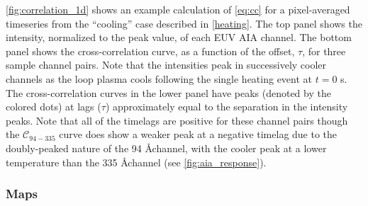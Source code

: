\autoref{fig:correlation_1d} shows an example calculation of \autoref{eq:cc} for a pixel-averaged timeseries from the ``cooling'' case described in \autoref{heating}. The top panel shows the intensity, normalized to the peak value, of each EUV AIA channel. The bottom panel shows the cross-correlation curve, as a function of the offset, $\tau$, for three sample channel pairs. Note that the intensities peak in successively cooler channels as the loop plasma cools following the single heating event at $t=0$ s. The cross-correlation curves in the lower panel have peaks (denoted by the colored dots) at lags ($\tau$) approximately equal to the separation in the intensity peaks. Note that all of the timelags are positive for these channel pairs though the $\mathcal{C}_{94-335}$ curve does show a weaker peak at a negative timelag due to the doubly-peaked nature of the 94 \AA channel, with the cooler peak at a lower temperature than the 335 \AA channel (see \autoref{fig:aia_response}).

\subsubsection{Maps}\label{timelag_maps}

